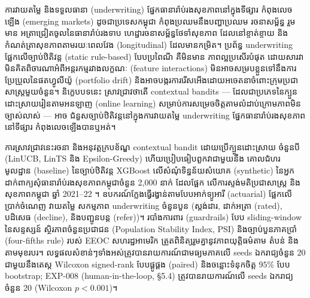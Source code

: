 \chapter*{\centering {}}

\begingroup
\khmerfont\fontsize{12pt}{19pt}\selectfont
\setlength{\emergencystretch}{3em}

\hs ការវាយតម្លៃ និងទទួលធានា (underwriting) ផ្នែកធានារ៉ាប់រងសុខភាពនៅក្នុងទីផ្សារ កំពុងលេចឡើង (emerging markets) ដូចជាប្រទេសកម្ពុជា កំពុងប្រឈមនឹងបញ្ហាប្រឈម រចនាសម្ព័ន្ធ រួមមាន អត្រាជ្រៀតចូលនៃធានារ៉ាប់រងទាប ហេដ្ឋារចនាសម្ព័ន្ធថែទាំសុខភាព ដែលនៅខ្ចាត់ខ្ចាយ និងកំណត់ត្រាសុខភាពតាមរយៈពេលវែង (longitudinal) ដែលមានកម្រិត។ ប្រព័ន្ធ underwriting ផ្អែកលើច្បាប់ឋិតិវន្ត (static rule-based) បែបប្រពៃណី គឺមិនមាន ភាពល្អប្រសើរបំផុត ដោយសារវាមិនគិតពិចារណាអំពីអន្តរកម្មរវាងលក្ខណៈ (feature interactions) មិនអាចសម្របខ្លួនទៅនឹងការប្រែប្រួលនៃផតហ្វូលីយ៉ូ (portfolio drift) និងអាចបង្ករការរើសអើងដោយអចេតនាចំពោះក្រុមប្រជាសាស្ត្រមួយចំនួន។ និក្ខេបបទនេះ ស្រាវជ្រាវថាតើ contextual bandits --- ដែលជាប្រភេទនៃក្បួនដោះស្រាយរៀនតាមអនឡាញ (online learning) សម្រាប់ការសម្រេចចិត្តតាមលំដាប់ក្រោមភាពមិនច្បាស់លាស់ --- អាច ជំនួសច្បាប់ឋិតិវន្តនៅក្នុងការវាយតម្លៃ underwriting ផ្នែកធានារ៉ាប់រងសុខភាពនៅទីផ្សារ កំពុងលេចឡើងបានឬអត់។

ការស្រាវជ្រាវនេះរចនា និងអនុវត្តក្របខ័ណ្ឌ contextual bandit ដោយប្រើក្បួនដោះស្រាយ ចំនួនបី (LinUCB, LinTS និង Epsilon-Greedy) ហើយប្រៀបធៀបពួកវាជាមួយនឹង គោលជំហរមូលដ្ឋាន (baseline) នៃច្បាប់ឋិតិវន្ត XGBoost លើសំណុំទិន្នន័យសំយោគ (synthetic) នៃអ្នកដាក់ពាក្យសុំធានារ៉ាប់រងសុខភាពកម្ពុជាចំនួន 2{,}000 នាក់ ដែលផ្អែក លើការស្ទង់មតិប្រជាសាស្ត្រ និងសុខភាពកម្ពុជា ឆ្នាំ 2021--22 \citep{NIS2023}។ ឧបករណ៍ក្លែងធ្វើរង្វាន់តាមបែបអាក់ទ្យូអារី (actuarial) ផ្អែកលើប្រាក់ចំណេញ វាយតម្លៃ សកម្មភាព underwriting ចំនួនបួន (ស្តង់ដារ, ដាក់អត្រា (rated), បដិសេធ (decline), និងបញ្ជូនបន្ត (refer))។ របាំងការពារ (guardrails) បែប sliding-window នៃសន្ទស្សន៍ ស្ថិរភាពចំនួនប្រជាជន (Population Stability Index, PSI) និងច្បាប់បួនភាគប្រាំ (four-fifths rule) របស់ EEOC សហរដ្ឋអាមេរិក ត្រួតពិនិត្យរួមគ្នានូវភាពយុត្តិធម៌តាម តំបន់ និងតាមមុខរបរ។ លទ្ធផលសំខាន់ៗទាំងអស់ត្រូវបានរាយការណ៍ជាមធ្យមភាគលើ seeds ឯករាជ្យចំនួន 20 ជាមួយនឹងតេស្ត Wilcoxon signed-rank បែបផ្គូផ្គង (paired) និងចន្លោះទំនុកចិត្ត $95\%$ បែប bootstrap; EXP-008 (human-in-the-loop, §5.4) ត្រូវបានរាយការណ៍លើ seeds ឯករាជ្យចំនួន 20 (Wilcoxon $p < 0.001$)។

